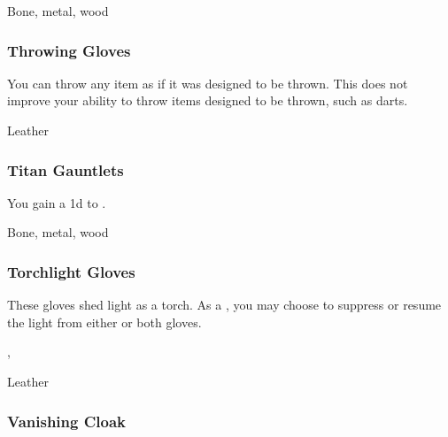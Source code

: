  


 Bone, metal, wood


\lowercase{\hypertarget{item:Throwing Gloves}{}}\label{item:Throwing Gloves}
\hypertarget{item:Throwing Gloves}{\subsubsection{Throwing Gloves\hfill{}}}

You can throw any item as if it was designed to be thrown.
This does not improve your ability to throw items designed to be thrown, such as darts.



 Leather


\lowercase{\hypertarget{item:Titan Gauntlets}{}}\label{item:Titan Gauntlets}
\hypertarget{item:Titan Gauntlets}{\subsubsection{Titan Gauntlets\hfill{}}}

You gain a \plus1d  to .



 Bone, metal, wood


\lowercase{\hypertarget{item:Torchlight Gloves}{}}\label{item:Torchlight Gloves}
\hypertarget{item:Torchlight Gloves}{\subsubsection{Torchlight Gloves\hfill{}}}

These gloves shed light as a torch.
As a , you may choose to suppress or resume the light from either or both gloves.



 , 


 Leather


\lowercase{\hypertarget{item:Vanishing Cloak}{}}\label{item:Vanishing Cloak}
\hypertarget{item:Vanishing Cloak}{\subsubsection{Vanishing Cloak\hfill{}}}

